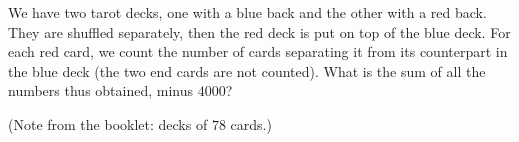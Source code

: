 We have two tarot decks, one with a blue back and the other with a red back. They are shuffled separately, then the red deck is put on top of the blue deck. For each red card, we count the number of cards separating it from its counterpart in the blue deck (the two end cards are not counted). What is the sum of all the numbers thus obtained, minus $4000$?

(Note from the booklet: decks of $78$ cards.)
